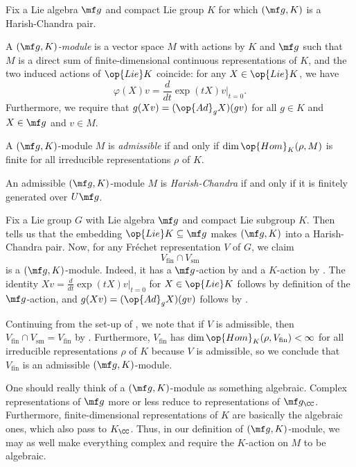 \documentclass[../notes.tex]{subfiles}
\begin{document}
\begin{defihelper}[$(\mf g,K)$-module] 
	Fix a Lie algebra $\mf g$ and compact Lie group $K$ for which $(\mf g,K)$ is a Harish-Chandra pair.
	\begin{listalph}
		\item A \textit{$(\mf g,K)$-module} is a vector space $M$ with actions by $K$ and $\mf g$ such that $M$ is a direct sum of finite-dimensional continuous representations of $K$, and the two induced actions of $\op{Lie}K$ coincide: for any $X\in\op{Lie}K$, we have
		\[\varphi(X)v=\frac d{dt}\exp(tX)v\bigg|_{t=0}.\]
		Furthermore, we require that $g(Xv)=(\op{Ad}_gX)(gv)$ for all $g\in K$ and $X\in\mf g$ and $v\in M$.
		\item A $(\mf g,K)$-module $M$ is \textit{admissible} if and only if $\dim\op{Hom}_K(\rho,M)$ is finite for all irreducible representations $\rho$ of $K$.
		\item An admissible $(\mf g,K)$-module $M$ is \textit{Harish-Chandra} if and only if it is finitely generated over $U\mf g$.
	\end{listalph}
\end{defihelper}
\begin{example} \label{ex:prototypical-g-k-mod}
	Fix a Lie group $G$ with Lie algebra $\mf g$ and compact Lie subgroup $K$. Then  tells us that the embedding $\op{Lie}K\subseteq\mf g$ makes $(\mf g,K)$ into a Harish-Chandra pair. Now, for any Fr\'echet representation $V$ of $G$, we claim
	\[V_{\mathrm{fin}}\cap V_{\mathrm{sm}}\]
	is a $(\mf g,K)$-module. Indeed, it has a $\mf g$-action by  and a $K$-action by . The identity $Xv=\frac d{dt}\exp(tX)v\big|_{t=0}$ for $X\in\op{Lie}K$ follows by definition of the $\mf g$-action, and $g(Xv)=(\op{Ad}_gX)(gv)$ follows by .
\end{example}
\begin{example}
	Continuing from the set-up of , we note that if $V$ is admissible, then $V_{\mathrm{fin}}\cap V_{\mathrm{sm}}=V_{\mathrm{fin}}$ by . Furthermore, $V_{\mathrm{fin}}$ has $\dim\op{Hom}_K(\rho,V_{\mathrm{fin}})<\infty$ for all irreducible representations $\rho$ of $K$ because $V$ is admissible, so we conclude that $V_{\mathrm{fin}}$ is an admissible $(\mf g,K)$-module.
\end{example}
\begin{remark}
	One should really think of a $(\mf g,K)$-module as something algebraic. Complex representations of $\mf g$ more or less reduce to representations of $\mf g_\CC$. Furthermore, finite-dimensional representations of $K$ are basically the algebraic ones, which also pass to $K_\CC$. Thus, in our definition of $(\mf g,K)$-module, we may as well make everything complex and require the $K$-action on $M$ to be algebraic.
\end{remark}
\end{document}
